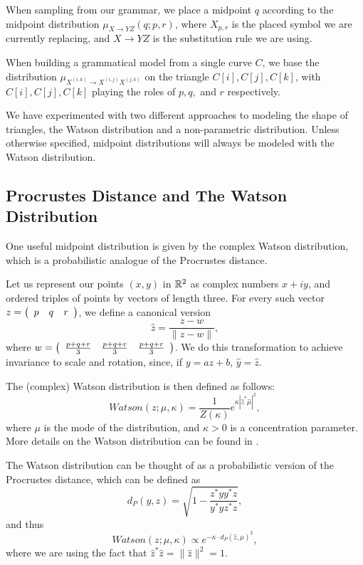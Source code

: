 

When sampling from our grammar, we place a midpoint $q$ according to
the midpoint distribution $\mu_{X\to YZ}(q; p, r)$, where $X_{p,r}$ is
the placed symbol we are currently replacing, and $X\to YZ$ is the
substitution rule we are using.

When building a grammatical model from a single curve $C$, we base the
distribution $\mu_{X^{(i,k)}\to X^{(i,j)}X^{(j,k)}}$ on the triangle
$C[i], C[j], C[k]$, with $C[i],C[j],C[k]$ playing the roles of $p,q,$
and $r$ respectively.

We have experimented with two different approaches to modeling the
shape of triangles, the Watson distribution and a non-parametric
distribution. Unless otherwise specified, midpoint distributions will
always be modeled with the Watson distribution.

\subsection{Procrustes Distance and The Watson Distribution}

One useful midpoint distribution is given by the complex Watson
distribution, which is a probabilistic analogue of the Procrustes
distance.

Let us represent our points $(x,y)$ in $\mathbb{R}^2$ as complex numbers
$x+iy$, and ordered triples of points by vectors of length three. For
every such vector $z=\left(\begin{array}{c c c} p& q&
    r\end{array}\right)$, we define a canonical version $$\widehat{z}
= \frac{z - w}{\| z - w \|},$$ where $w =
\left(\begin{array}{c c c} \frac{p+q+r}{3}& \frac{p+q+r}{3}&
    \frac{p+q+r}{3} \end{array}\right)$. We do this transformation to
achieve invariance to scale and rotation, since, if $y = az + b$,
$\widehat{y}=\widehat{z}$.

The (complex) Watson distribution is then defined as follows: 
$$Watson(z; \mu,\kappa) =
\frac{1}{Z(\kappa)}e^{\kappa | \widehat{z}^*\widehat{\mu}|^2},$$ where
$\mu$ is the mode of the distribution, and $\kappa>0$ is a
concentration parameter. More details on the Watson distribution can
be found in \cite{mardia-dryden}.

The Watson distribution can be thought of as a probabilistic version
of the Procrustes distance, which can be defined as
$$d_P(y,z) = \sqrt{1- \frac{z^* y y^* z}{y^* y z^* z}},$$
and thus 
$$Watson(z; \mu, \kappa) \propto e^{-\kappa \cdot d_P(\widehat{z}, \widehat{\mu})^2},$$
where we are using the fact that $\widehat{z}^*
\widehat{z} = \| \widehat{z} \|^2 = 1$.

